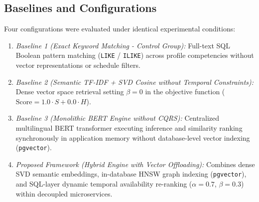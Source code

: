 \documentclass[a4paper,fleqn]{cas-dc}
\begin{document}
\subsection{Baselines and Configurations}
Four configurations were evaluated under identical experimental conditions:
\begin{enumerate}
    \item \textit{Baseline 1 (Exact Keyword Matching - Control Group):} Full-text SQL Boolean pattern matching (\texttt{LIKE} / \texttt{ILIKE}) across profile competencies without vector representations or schedule filters.
    \item \textit{Baseline 2 (Semantic TF-IDF + SVD Cosine without Temporal Constraints):} Dense vector space retrieval \cite{alsaif2022, koren2009} setting $\beta = 0$ in the objective function ($\text{Score} = 1.0 \cdot S + 0.0 \cdot H$).
    \item \textit{Baseline 3 (Monolithic BERT Engine without CQRS):} Centralized multilingual BERT transformer executing inference and similarity ranking synchronously in application memory without database-level vector indexing (\texttt{pgvector}).
    \item \textit{Proposed Framework (Hybrid Engine with Vector Offloading):} Combines dense SVD semantic embeddings, in-database HNSW graph indexing (\texttt{pgvector}), and SQL-layer dynamic temporal availability re-ranking ($\alpha = 0.7$, $\beta = 0.3$) within decoupled microservices.
\end{enumerate}
\end{document}
